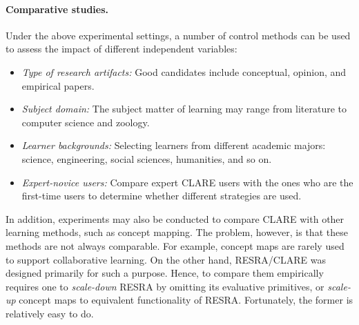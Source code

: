 \paragraph{Comparative studies.}

Under the above experimental settings, a number of control methods can be
used to assess the impact of different independent variables:

\begin{itemize}
\item {\it Type of research artifacts:\/} Good candidates include
  conceptual, opinion, and empirical papers.
  
\item {\it Subject domain:\/} The subject matter of learning may range
  from literature to computer science and zoology. 
  
\item {\it Learner backgrounds:\/} Selecting learners from different
  academic majors: science, engineering, social sciences, humanities, and
  so on.
  
\item {\it Expert-novice users:\/} Compare expert CLARE users with the
  ones who are the first-time users to determine whether different
  strategies are used.
\end{itemize}

In addition, experiments may also be conducted to compare CLARE with other
learning methods, such as concept mapping. The problem, however, is that
these methods are not always comparable. For example, concept maps are
rarely used to support collaborative learning. On the other hand,
RESRA/CLARE was designed primarily for such a purpose. Hence, to compare
them empirically requires one to {\it scale-down} RESRA by omitting its
evaluative primitives, or {\it scale-up\/} concept maps to equivalent
functionality of RESRA. Fortunately, the former is relatively easy to do.






